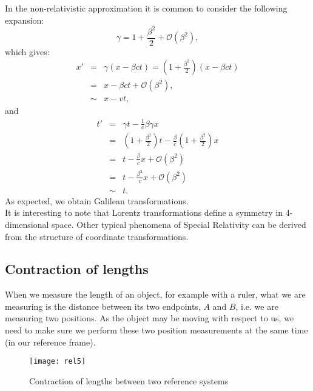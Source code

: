 In the non-relativistic approximation it is common to consider the following expansion:
\begin{equation}
  \gamma = 1 + \frac{\beta^2}{2}+\mathcal{O}(\beta^2),
\end{equation}
which gives:
\begin{eqnarray*}
  x' &= & \gamma\left(x-\beta c t\right) = \left(1+\frac{\beta^2}{2}\right)\left(x-\beta c t\right)\\
  &= &x - \beta c t +\mathcal{O}(\beta^2),\\
  &\sim & x - vt,
\end{eqnarray*}
and
\begin{eqnarray*}
  t' &=& \gamma t -\frac{1}{c}\beta\gamma x \\
  &=& \left(1+\frac{\beta^2}{2}\right) t - \frac{\beta}{c}\left(1+\frac{\beta^2}{2}\right) x \\
  &=& t - \frac{\beta}{c}x +\mathcal{O}(\beta^2)\\
  &=& t - \frac{\beta^2}{v}x +\mathcal{O}(\beta^2)\\
  &\sim & t.
\end{eqnarray*}
As expected, we obtain Galilean transformations.\\

It is interesting to note that Lorentz transformations define a symmetry in 4-dimensional space. Other typical phenomena of Special Relativity can be derived from the structure of coordinate transformations.

\subsection{Contraction of lengths}
When we measure the length of an object, for example with a ruler, what we are measuring is the distance between its two endpoints, $A$ and $B$, i.e. we are measuring two positions. As the object may be moving with respect to us, we need to make sure we perform these two position measurements at the same time (in our reference frame).

\begin{figure}
  \centering
  \texttt{[image: rel5]}
  \caption{Contraction of lengths between  two reference systems}
  \label{fig:rel5contraction}
\end{figure}{}

